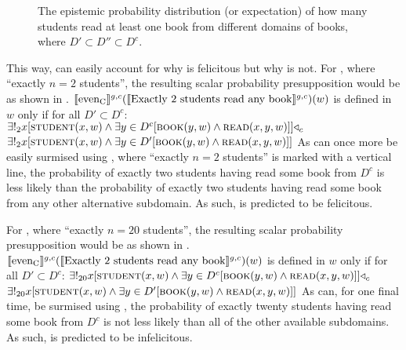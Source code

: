 \begin{figure}[!htb]
    
    \caption{The epistemic probability distribution (or expectation) of how many students read at least one book from different domains of books, where $D'\subset D''\subset D^c$.}
\end{figure}
This way, \textcite{Crnic2011,Crnic2014-dogma,Crnic2014-nm} can easily account for why  is felicitous but why  is not. For , where \enquote{exactly $n=2$ students}, the resulting scalar probability presupposition would be as shown in .
\ex{}
$\intension[g,c]{even\textsubscript{C}}(\intension[g,c]{Exactly 2 students read any book})(w)$ is defined in $w$ only if for all $D'\subset D^c$: $\exists!_2{x}[\predicate{student}(x,w)\land\exists{y\in{D^c}}[\predicate{book}(y,w)\land\predicate{read}(x,y,w)]]\lprob_c$\\\emptyfill$\exists!_2{x}[\predicate{student}(x,w)\land\exists{y\in{D'}}[\predicate{book}(y,w)\land\predicate{read}(x,y,w)]]$
\xe
As can once more be easily surmised using , where \enquote{exactly $n=2$ students} is marked with a vertical line, the probability of exactly two students having read some book from $D^c$ is less likely than the probability of exactly two students having read some book from any other alternative subdomain. As such,  is predicted to be felicitous.

For , where \enquote{exactly $n=20$ students}, the resulting scalar probability presupposition would be as shown in .
\ex{}
$\intension[g,c]{even\textsubscript{C}}(\intension[g,c]{Exactly 2 students read any book})(w)$ is defined in $w$ only if for all $D'\subset D^c$: $\exists!_{20}{x}[\predicate{student}(x,w)\land\exists{y\in{D^c}}[\predicate{book}(y,w)\land\predicate{read}(x,y,w)]]\lprob_c$\\\emptyfill$\exists!_{20}{x}[\predicate{student}(x,w)\land\exists{y\in{D'}}[\predicate{book}(y,w)\land\predicate{read}(x,y,w)]]$
\xe
As can, for one final time, be surmised using , the probability of exactly twenty students having read some book from $D^c$ is not less likely than all of the other available subdomains. As such,  is predicted to be infelicitous.

